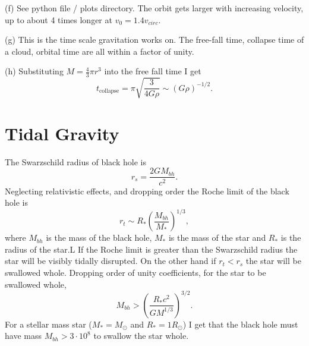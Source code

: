 \documentclass[11pt]{article}
\begin{document}
(f) See python file / plots directory. The orbit gets larger with increasing velocity, up to about 4 times longer at \(v_0 = 1.4 v_{circ}\).


(g) This is the time scale gravitation works on.
The free-fall time, collapse time of a cloud, orbital time are all within a factor of unity.

(h) Substituting \(M = \frac{4}{3} \pi r^3\) into the free fall time I get
\begin{equation}
 t_{\text{collapse}} = \pi \sqrt{ \frac{3}{4 G \rho} } \sim \left(  G \rho \right)^{-1/2} .
\end{equation}
\section{Tidal Gravity}
\label{sec:org78c7df3}
The Swarzschild radius of black hole is
\begin{equation}
 r_s = \frac{2 G M_{bh}}{c^2}.
\end{equation}
Neglecting relativistic effects, and dropping order the Roche limit of the black hole is
\begin{equation}
 r_t \sim R_* \left( \frac{M_{bh}}{M_{*}}   \right)^{1/3},
\end{equation}
where \(M_{bh}\) is the mass of the black hole, \(M_*\) is the mass of the star and \(R_*\) is the radius of the star.L
If the Roche limit is greater than the Swarzschild radius the star will be visibly tidally disrupted.
On the other hand if \(r_t < r_s\) the star will be swallowed whole.
Dropping order of unity coefficients, for the star to be swallowed whole,
\begin{equation}
 M_{bh} > \left ( \frac{R_* c^2}{G M^{1/3}} \right )^{3/2}.
\end{equation}
For a stellar mass star (\(M_* = M_\odot\) and \(R_* = 1 R_\odot\)) I get that the black hole must have mass \(M_{bh} > 3 \cdot 10^8\) to swallow the star whole.
\end{document}
